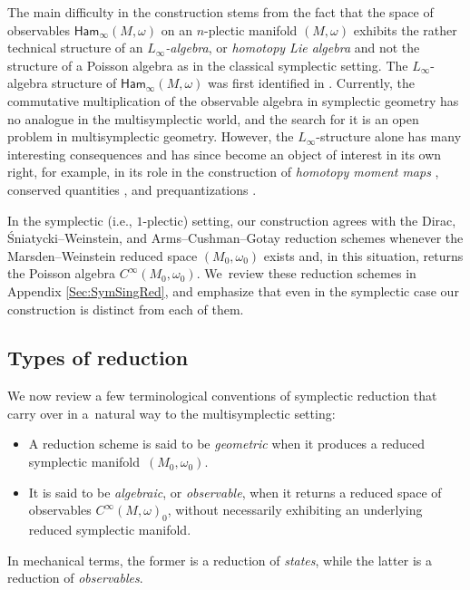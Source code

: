 \documentclass[10pt,a4paper]{amsart}
\numberwithin{equation}{section}
\newcommand{\Ham}{\mathsf{Ham}}
\begin{document}
The main difficulty in the construction stems from the fact that the space of observables $\Ham_\infty(M,\omega)$ on an $n$-plectic manifold $(M,\omega)$ exhibits the rather technical structure of an \emph{$L_\infty$-algebra}, or \emph{homotopy Lie algebra} and not the structure of a Poisson algebra as in the classical symplectic setting. The $L_\infty$-algebra structure of $\Ham_\infty(M,\omega)$ was first identified in \cite{Rogers10}. Currently, the commutative multiplication of the observable algebra in symplectic geometry has no analogue in the multisymplectic world, and the search for it is an open problem in multisymplectic geometry. However, the $L_\infty$-structure alone has many interesting consequences and has since become an object of interest in its own right, for example, in its role in the construction of \emph{homotopy moment maps} \cite{CalliesFregierRogersZambon16,FregierLaurent-GengouxZambon15,Herman18,ShabaziZambon16}, conserved quantities \cite{RyvkinWurzbacherZambon20}, and prequantizations \cite{FiorenzaRogersSchreiber14, SevestreWurzbacher21}.

In the symplectic (i.e., $1$-plectic) setting, our construction agrees with the Dirac, \'Sniatycki--Weinstein, and Arms--Cushman--Gotay reduction schemes whenever the Marsden--Weinstein reduced space $(M_0,\omega_0)$ exists and, in this situation, returns the Poisson algebra $C^\infty(M_0,\omega_0)$. We~review these reduction schemes in Appendix \ref{Sec:SymSingRed}, and emphasize that even in the symplectic case our construction is distinct from each of them.


\subsection*{Types of reduction}

We now review a few terminological conventions of symplectic reduction that carry over in a~natural way to the multisymplectic setting:
\begin{itemize}\itemsep=0pt
	\item A reduction scheme is said to be \emph{geometric} when it produces a reduced symplectic mani\-fold~$(M_0,\omega_0)$.
	\item It is said to be \emph{algebraic}, or \emph{observable}, when it returns a reduced space of observables $C^\infty(M,\omega)_0$, without necessarily exhibiting an underlying reduced symplectic manifold.
\end{itemize}
In mechanical terms, the former is a reduction of \emph{states}, while the latter is a reduction of \emph{observables}.
\end{document}
